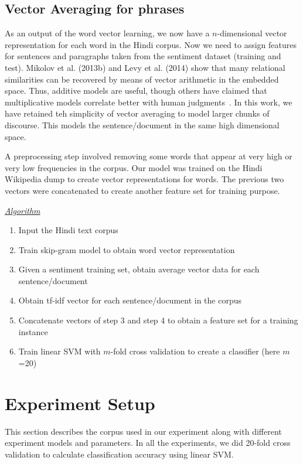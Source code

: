 \def\DevnagVersion{2.15}\documentclass[11pt]{article}
\begin{document}
\subsection{Vector Averaging for phrases}
As an output of the word vector learning, we now have a $n$-dimensional
vector representation for each word in the Hindi corpus.  Now we need to
assign features for sentences and paragraphs taken from the sentiment dataset
(training and test).  Mikolov et al. (2013b) and Levy et al. (2014) show that
many relational similarities can be recovered by means of vector arithmetic
in the embedded space.  Thus, additive models are useful, though
others have claimed that multiplicative models correlate better with human
judgments~\cite{Mitchell:08,Socher:13}.  In this work, we have retained teh
simplicity of vector averaging to model larger chunks of  discourse.
This models the sentence/document in the same high dimensional space.

A preprocessing step involved removing some words that appear at very high or
very low frequencies in the corpus.  
Our model was trained on the Hindi Wikipedia dump to create vector
representations for words. The previous two vectors were concatenated to
create another feature set for training purpose.  

\underline{\emph{Algorithm}}
\begin{enumerate}
\item Input the Hindi text corpus
\item Train skip-gram model to obtain word vector representation
\item Given a sentiment training set, obtain average vector data for each sentence/document
\item Obtain tf-idf vector for each sentence/document in the corpus
\item Concatenate vectors of step 3 and step 4 to obtain a feature set for a training instance
\item Train linear SVM with $m$-fold cross validation to create a classifier
(here $m$=20)
\end{enumerate}

\section{Experiment Setup}
This section describes the corpus used in our experiment along with different experiment models and parameters. In all the experiments, we did 20-fold cross validation to calculate classification accuracy using linear SVM.
\end{document}
